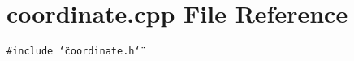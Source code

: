 \section{coordinate.cpp File Reference}
\label{coordinate_8cpp}
{\tt \#include \char`\"{}coordinate.h\char`\"{}}\par
